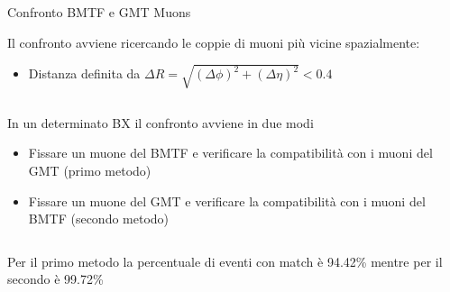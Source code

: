 \documentclass{beamer}
\begin{document}
\begin{frame}{Confronto BMTF e GMT Muons}

Il confronto avviene ricercando le coppie di muoni più vicine spazialmente:
\begin{itemize}
    \item Distanza definita da $\Delta R = \sqrt{(\Delta \phi)^2 + (\Delta \eta)^2} < 0.4$

\end{itemize}

\begin{columns}

    \begin{column}{0.5\textwidth}
    In un determinato BX il confronto avviene in due modi
        \begin{itemize}
            \item Fissare un muone del BMTF e verificare la compatibilità con i muoni del GMT (primo metodo)
            \item Fissare un muone del GMT e verificare la compatibilità con i muoni del BMTF (secondo metodo)
        \end{itemize}
    \end{column}
    \begin{column}{0.5\textwidth}
        \centering
        \vspace{0.5 cm}
    \end{column}
\end{columns}

\vspace{0.5 cm}
Per il primo metodo la percentuale di eventi con match è 94.42\% mentre per il secondo è 99.72\%

\end{frame}
\end{document}
